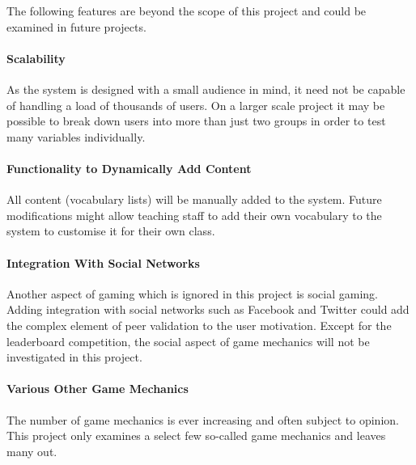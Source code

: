 The following features are beyond the scope of this project and could be examined
in future projects.

\paragraph{Scalability}
As the system is designed with a small audience in mind, it need not be capable
of handling a load of thousands of users. On a larger scale project it may be
possible to break down users into more than just two groups in order to test
many variables individually.

\paragraph{Functionality to Dynamically Add Content}
All content (vocabulary lists) will be manually added to the system. Future
modifications might allow teaching staff to add their own vocabulary to the
system to customise it for their own class.

\paragraph{Integration With Social Networks}
Another aspect of gaming which is ignored in this project is social gaming.
Adding integration with social networks such as Facebook and Twitter could add
the complex element of peer validation to the user motivation. Except for the
leaderboard competition, the social aspect of game mechanics will not be 
investigated in this project.

\paragraph{Various Other Game Mechanics}
The number of game mechanics is ever increasing and often subject to opinion.
This project only examines a select few so-called game mechanics and leaves many
out.
